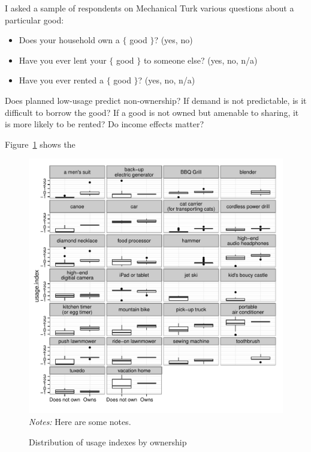 \documentclass[11pt]{article}
\begin{document}
I asked a sample of respondents on Mechanical Turk various questions about a particular good: 
\begin{itemize} 
\item Does your household own a $\{$ good $\}$? (yes, no) 
\item Have you ever lent your $\{$ good $\}$ to someone else? (yes, no, n/a)
\item Have you ever rented a $\{$ good $\}$? (yes, no, n/a)
\end{itemize}  

Does planned low-usage predict non-ownership? 
If demand is not predictable, is it difficult to borrow the good? 
If a good is not owned but amenable to sharing, it is more likely to be rented? 
Do income effects matter? 

Figure~\ref{fig:usage_by_own} shows the 

\begin{figure}
\centering 
\caption{Distribution of usage indexes by ownership}
\label{fig:usage_by_own}
\begin{minipage}{0.90 \linewidth}
\includegraphics[width = \linewidth]{./plots/usage_by_own.pdf} 
\\
{\footnotesize
\emph{Notes:} Here are some notes. 
}
\end{minipage} 
\end{figure} 
\end{document}
